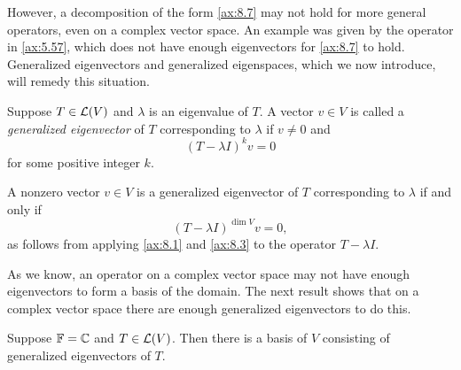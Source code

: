 However, a decomposition of the form \ref{ax:8.7} may not hold for more general
operators, even on a complex vector space. An example was given by the operator
in \ref{ax:5.57}, which does not have enough eigenvectors for \ref{ax:8.7} to
hold. Generalized eigenvectors and generalized eigenspaces, which we now
introduce, will remedy this situation.

\begin{definition}\label{ax:8.8}
Suppose $T\in\mathcal{L}(V)$ and $\lambda$ is an eigenvalue of $T$. A vector $v\in V$
is called a \emph{generalized eigenvector} of $T$ corresponding to $\lambda$ if
$v\ne0$ and
\[ (T-\lambda I)^kv = 0 \]
for some positive integer $k$.
\end{definition}

%
A nonzero vector $v\in V$ is a generalized eigenvector of $T$ corresponding to
$\lambda$ if and only if
\[ (T-\lambda I)^{\dim V}v = 0, \]
as follows from applying \ref{ax:8.1} and \ref{ax:8.3} to the operator
$T-\lambda I$.

As we know, an operator on a complex vector space may not have enough
eigenvectors to form a basis of the domain. The next result shows that on a
complex vector space there are enough generalized eigenvectors to do this.

\begin{result}\label{ax:8.9}
Suppose $\mathbb{F}=\mathbb{C}$ and $T\in\mathcal{L}(V)$. Then there is a basis of $V$ consisting of
generalized eigenvectors of $T$.
\end{result}

